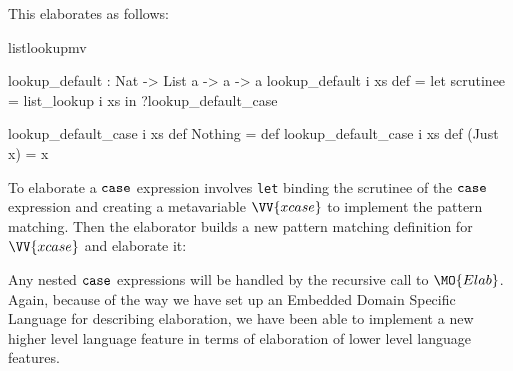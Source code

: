 
\noindent
This elaborates as follows:

\begin{SaveVerbatim}{listlookupmv}

lookup_default : Nat -> List a -> a -> a
lookup_default i xs def = 
   let scrutinee = list_lookup i xs in ?lookup_default_case

lookup_default_case i xs def Nothing  = def
lookup_default_case i xs def (Just x) = x

\end{SaveVerbatim}

To elaborate a $\mathtt{case}$ expression involves \texttt{let} binding the scrutinee of
the $\mathtt{case}$ expression and creating a metavariable $\VV{xcase}$ to implement the
pattern matching. Then the elaborator builds a new pattern matching definition for $\VV{xcase}$
and elaborate it:


Any nested $\mathtt{case}$ expressions will be handled by the recursive call to
$\MO{Elab}$. Again, because of the way we have set up an Embedded Domain Specific
Language for describing elaboration, we have been able to implement a new higher
level language feature in terms of elaboration of lower level language features.






